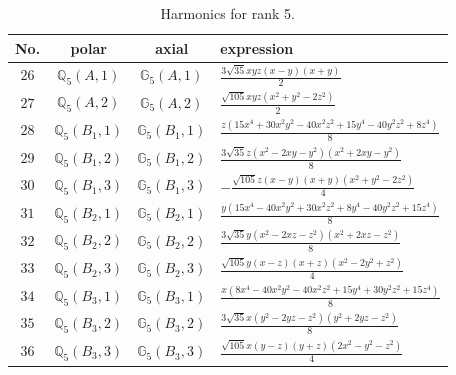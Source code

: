 \documentclass[fleqn,8pt,landscape]{jsarticle}
\begin{document}
\begin{table}[ht!]
\begin{center}
\caption{Harmonics for rank 5.}
\renewcommand{\arraystretch}{1.3}
\begin{tabular}{cccl} \hline \hline
No. & polar & axial & expression \\ \hline
$ 26 $ & $ \mathbb{Q}_{5}(A,1) $ & $ \mathbb{G}_{5}(A,1) $ & $ \frac{3 \sqrt{35} x y z \left(x - y\right) \left(x + y\right)}{2} $ \\
$ 27 $ & $ \mathbb{Q}_{5}(A,2) $ & $ \mathbb{G}_{5}(A,2) $ & $ \frac{\sqrt{105} x y z \left(x^{2} + y^{2} - 2 z^{2}\right)}{2} $ \\
$ 28 $ & $ \mathbb{Q}_{5}(B_{1},1) $ & $ \mathbb{G}_{5}(B_{1},1) $ & $ \frac{z \left(15 x^{4} + 30 x^{2} y^{2} - 40 x^{2} z^{2} + 15 y^{4} - 40 y^{2} z^{2} + 8 z^{4}\right)}{8} $ \\
$ 29 $ & $ \mathbb{Q}_{5}(B_{1},2) $ & $ \mathbb{G}_{5}(B_{1},2) $ & $ \frac{3 \sqrt{35} z \left(x^{2} - 2 x y - y^{2}\right) \left(x^{2} + 2 x y - y^{2}\right)}{8} $ \\
$ 30 $ & $ \mathbb{Q}_{5}(B_{1},3) $ & $ \mathbb{G}_{5}(B_{1},3) $ & $ - \frac{\sqrt{105} z \left(x - y\right) \left(x + y\right) \left(x^{2} + y^{2} - 2 z^{2}\right)}{4} $ \\
$ 31 $ & $ \mathbb{Q}_{5}(B_{2},1) $ & $ \mathbb{G}_{5}(B_{2},1) $ & $ \frac{y \left(15 x^{4} - 40 x^{2} y^{2} + 30 x^{2} z^{2} + 8 y^{4} - 40 y^{2} z^{2} + 15 z^{4}\right)}{8} $ \\
$ 32 $ & $ \mathbb{Q}_{5}(B_{2},2) $ & $ \mathbb{G}_{5}(B_{2},2) $ & $ \frac{3 \sqrt{35} y \left(x^{2} - 2 x z - z^{2}\right) \left(x^{2} + 2 x z - z^{2}\right)}{8} $ \\
$ 33 $ & $ \mathbb{Q}_{5}(B_{2},3) $ & $ \mathbb{G}_{5}(B_{2},3) $ & $ \frac{\sqrt{105} y \left(x - z\right) \left(x + z\right) \left(x^{2} - 2 y^{2} + z^{2}\right)}{4} $ \\
$ 34 $ & $ \mathbb{Q}_{5}(B_{3},1) $ & $ \mathbb{G}_{5}(B_{3},1) $ & $ \frac{x \left(8 x^{4} - 40 x^{2} y^{2} - 40 x^{2} z^{2} + 15 y^{4} + 30 y^{2} z^{2} + 15 z^{4}\right)}{8} $ \\
$ 35 $ & $ \mathbb{Q}_{5}(B_{3},2) $ & $ \mathbb{G}_{5}(B_{3},2) $ & $ \frac{3 \sqrt{35} x \left(y^{2} - 2 y z - z^{2}\right) \left(y^{2} + 2 y z - z^{2}\right)}{8} $ \\
$ 36 $ & $ \mathbb{Q}_{5}(B_{3},3) $ & $ \mathbb{G}_{5}(B_{3},3) $ & $ \frac{\sqrt{105} x \left(y - z\right) \left(y + z\right) \left(2 x^{2} - y^{2} - z^{2}\right)}{4} $ \\
 \hline \hline
\end{tabular}
\end{center}
\end{table}
\end{document}
